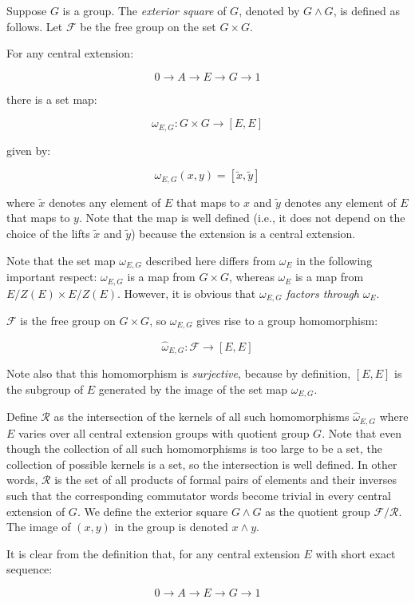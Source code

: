 Suppose $G$ is a group. The {\em exterior square} of $G$, denoted by
$G \wedge G$, is defined as follows. Let $\mathcal{F}$ be the free
group on the set $G \times G$. 

For any central extension:

$$0 \to A \to E \to G \to 1$$

there is a set map:

$$\omega_{E,G}: G \times G \to [E,E]$$

given by:

$$\omega_{E,G}(x,y) = [\tilde{x},\tilde{y}]$$

where $\tilde{x}$ denotes any element of $E$ that maps to $x$ and
$\tilde{y}$ denotes any element of $E$ that maps to $y$. Note that the
map is well defined (i.e., it does not depend on the choice of the
lifts $\tilde{x}$ and $\tilde{y}$) because the extension is a central
extension.

Note that the set map $\omega_{E,G}$ described here differs from
$\omega_E$ in the following important respect: $\omega_{E,G}$ is a map
from $G \times G$, whereas $\omega_E$ is a map from $E/Z(E) \times
E/Z(E)$. However, it is obvious that $\omega_{E,G}$ {\em factors
  through} $\omega_E$.

$\mathcal{F}$ is the free group on $G \times G$, so $\omega_{E,G}$ gives rise to a group homomorphism:

$$\hat{\omega}_{E,G}:\mathcal{F} \to [E,E]$$

Note also that this homomorphism is {\em surjective}, because by
definition, $[E,E]$ is the subgroup of $E$ generated by the image of the
set map $\omega_{E,G}$.

Define $\mathcal{R}$ as the intersection of the kernels of all such
homomorphisms $\hat{\omega}_{E,G}$ where $E$ varies over all central
extension groups with quotient group $G$. Note that even though the
collection of all such homomorphisms is too large to be a set, the
collection of possible kernels is a set, so the intersection is well
defined. In other words, $\mathcal{R}$ is the set of all products of
formal pairs of elements and their inverses such that the
corresponding commutator words become trivial in every central
extension of $G$. We define the exterior square $G \wedge G$ as the
quotient group $\mathcal{F}/\mathcal{R}$. The image of $(x,y)$ in the
group is denoted $x \wedge y$.

It is clear from the definition that, for any central
extension $E$ with short exact sequence:

$$0 \to A \to E \to G \to 1$$

